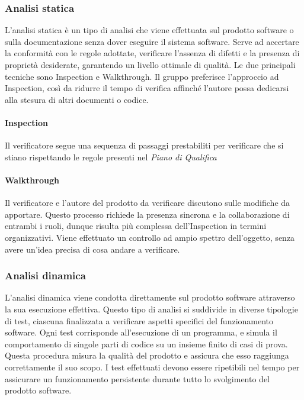 \documentclass[10pt]{article}
\begin{document}
\begin{justify}
    \subsubsection{Analisi statica}
    L'analisi statica è un tipo di analisi che viene effettuata sul prodotto software o sulla documentazione senza dover eseguire il sistema software. Serve ad accertare la conformità con le regole adottate, verificare l'assenza di difetti e la presenza di proprietà desiderate, garantendo un livello ottimale di qualità. Le due principali tecniche sono Inspection e Walkthrough. Il gruppo preferisce l'approccio ad Inspection, così da ridurre il tempo di verifica affinché l'autore possa dedicarsi alla stesura di altri documenti o codice.
    \paragraph{Inspection}
    Il verificatore segue una sequenza di passaggi prestabiliti per verificare che si stiano rispettando le regole presenti nel \textit{Piano di Qualifica}
    \paragraph{Walkthrough}
    Il verificatore e l'autore del prodotto da verificare discutono sulle modifiche da apportare. Questo processo richiede la presenza sincrona e la collaborazione di entrambi i ruoli, dunque risulta più complessa dell'Inspection in termini organizzativi. Viene effettuato un controllo ad ampio spettro dell'oggetto, senza avere un'idea precisa di cosa andare a verificare.


    \subsubsection{Analisi dinamica}
    L'analisi dinamica viene condotta direttamente sul prodotto software attraverso la sua esecuzione effettiva. Questo tipo di analisi si suddivide in diverse tipologie di test, ciascuna finalizzata a verificare aspetti specifici del funzionamento software. Ogni test corrisponde all'esecuzione di un programma, e simula il comportamento di singole parti di codice su un insieme finito di casi di prova.\\
    Questa procedura misura la qualità del prodotto e assicura che esso raggiunga correttamente il suo scopo. I test effettuati devono essere ripetibili nel tempo per assicurare un funzionamento persistente durante tutto lo svolgimento del prodotto software.

\end{justify}
\end{document}
